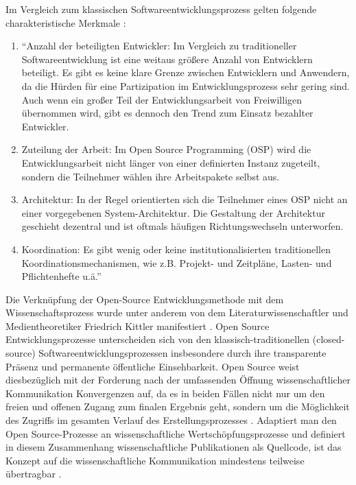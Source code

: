 Im Vergleich zum klassischen Softwareentwicklungsprozess gelten folgende charakteristische Merkmale \cite{suchen}:
\begin{enumerate}
\item “Anzahl der beteiligten Entwickler: Im Vergleich zu traditioneller Softwareentwicklung ist eine weitaus größere Anzahl von Entwicklern beteiligt. Es gibt es keine klare Grenze zwischen Entwicklern und Anwendern, da die Hürden für eine Partizipation im Entwicklungsprozess sehr gering sind. Auch wenn ein großer Teil der Entwicklungsarbeit von Freiwilligen übernommen wird, gibt es dennoch den Trend zum Einsatz bezahlter Entwickler.
\item Zuteilung der Arbeit: Im Open Source Programming (OSP) wird die Entwicklungsarbeit nicht länger von einer definierten Instanz zugeteilt, sondern die Teilnehmer wählen ihre Arbeitspakete selbst aus.
\item Architektur: In der Regel orientierten sich die Teilnehmer eines OSP nicht an einer vorgegebenen System-Architektur. Die Gestaltung der Architektur geschieht dezentral und ist oftmals häufigen Richtungswechseln unterworfen.
\item Koordination: Es gibt wenig oder keine institutionalisierten traditionellen Koordinationsmechanismen, wie z.B. Projekt- und Zeitpläne, Lasten- und Pflichtenhefte u.ä.” \cite{suchen}
\end{enumerate}

Die Verknüpfung der Open-Source Entwicklungsmethode mit dem Wissenschaftsprozess wurde unter anderem von dem Literaturwissenschaftler und Medientheoretiker Friedrich Kittler manifestiert \cite{cite:1}. Open Source Entwicklungsprozesse unterscheiden sich von den klassisch-traditionellen (closed-source) Softwareentwicklungsprozessen insbesondere durch ihre transparente Präsenz und permanente öffentliche Einsehbarkeit. Open Source weist diesbezüglich mit der Forderung nach der umfassenden Öffnung wissenschaftlicher Kommunikation Konvergenzen auf, da es in beiden Fällen nicht nur um den freien und offenen Zugang zum finalen Ergebnis geht, sondern um die Möglichkeit des Zugriffs im gesamten Verlauf des Erstellungsprozesses \cite{kelty_2004_pruefen!}. Adaptiert man den Open Source-Prozesse an wissenschaftliche Wertschöpfungsprozesse und definiert in diesem Zusammenhang wissenschaftliche Publikationen als Quellcode, ist das Konzept auf die wissenschaftliche Kommunikation mindestens teilweise übertragbar \cite{Singh_2008} \cite{Bradley_2008} \cite{dorschel_2006_open} \cite{Bradley_2007} \cite{Willinsky_2005}.

